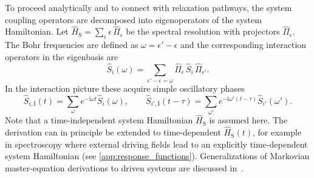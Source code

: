 To proceed analytically and to connect with relaxation pathways, the system coupling operators are decomposed into eigenoperators of the system Hamiltonian. Let $\hat{H}_{\mathrm{S}} = \sum_{\epsilon} \epsilon \, \hat{\Pi}_{\epsilon}$ be the spectral resolution with projectors $\hat{\Pi}_{\epsilon}$. The Bohr frequencies are defined as $\omega = \epsilon' - \epsilon$ and the corresponding interaction operators in the eigenbasis are
\begin{equation*}
	\hat{S}_i(\omega) = \sum_{\epsilon' - \epsilon = \omega} \hat{\Pi}_{\epsilon} \, \hat{S}_i \, \hat{\Pi}_{\epsilon'}.
\end{equation*}
In the interaction picture these acquire simple oscillatory phases
\begin{equation}
	\hat{S}_{i,\mathrm{I}}(t) = \sum_{\omega} e^{-\mathrm{i} \omega t} \hat{S}_i(\omega), \qquad \hat{S}_{i',\mathrm{I}}(t-\tau) = \sum_{\omega'} e^{-\mathrm{i} \omega'(t-\tau)} \hat{S}_{i'}(\omega').
	\label{eq:oqs_Interaction_Picture_Eigenoperators}
\end{equation}
Note that a time-independent system Hamiltonian $\hat{H}_{\mathrm{S}}$ is assumed here. The derivation can in principle be extended to time-dependent $\hat{H}_{\mathrm{S}}(t)$, for example in spectroscopy where external driving fields lead to an explicitly time-dependent system Hamiltonian \cite{mukamel1995principlesnonlinearoptical} (see \autoref{app:response_functions}). Generalizations of Markovian master-equation derivations to driven systems are discussed in~\cite{dabbruzzoetal2023timedependentregularizationredfield}.

